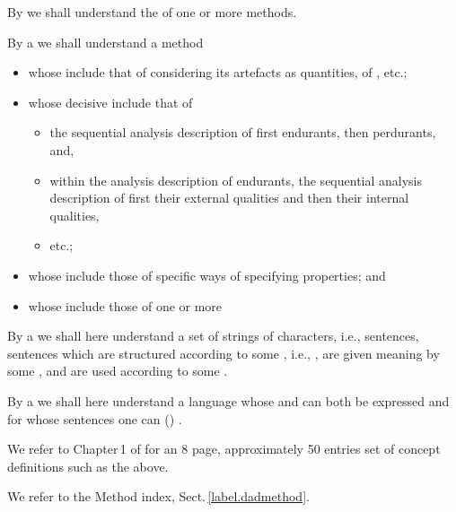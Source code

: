 \begynd
\pind By  we shall understand 
\begynd
\pind the  of one or more methods.
\afslut
\afslut
\mnewfoil

\pind By a  we shall understand a method
\begin{itemize}
\item  whose  include that of considering its artefacts as
       quantities, of , etc.;
\item  whose decisive  include that of
\begin{itemize}
\item the sequential
      analysis \ysfchg{\&} description of first endurants, then perdurants,
      and,
\item  within the analysis  \ysfchg{\&} description of endurants, the
      sequential  analysis   \ysfchg{\&} description of first their external
      qualities and then their internal qualities,
\item etc.; 
\end{itemize}
\item  whose  include those of specific ways of
       specifying properties; and
\item  whose  include those of one or more
\end{itemize}
\mnewfoil

\noindent
\begynd
\pind By a  we shall here understand \nyl a set of
strings of characters, i.e., sentences, 
\begynd
\pind sentences which are structured according to some ,
      i.e., , 
\pind are given meaning by some ,
\pind and are used according to some . 
\afslut
\afslut

\begynd
\pind By a  we shall here understand a language 
\begynd
\pind whose  and  can both be expressed
\pind and for whose sentences one can 
      () . 
\afslut

\pind We refer to Chapter\,1 of \cite{BjornerMonograph2020} for an 8
      page, approximately 50 entries set of concept definitions such
      as the above.
      
\pind We refer to the \textsf{Method} index, Sect.\,\vref{label.dadmethod}.
\afslut
      
\treprikker

